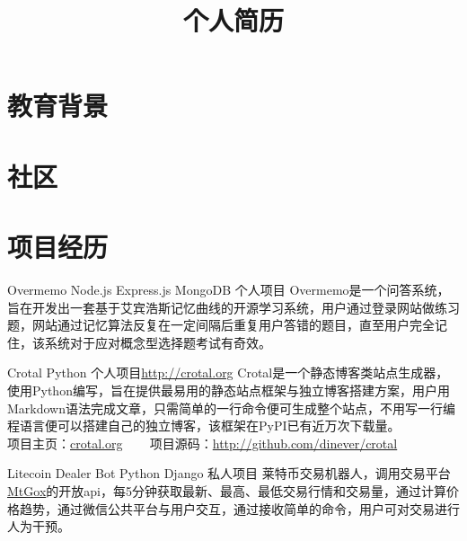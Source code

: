 \documentclass[11pt,a4paper]{moderncv}
\title{个人简历}                      %
\begin{document}
\maketitle

\section{教育背景}


\section{社区}

\section{项目经历}
\renewcommand{\baselinestretch}{1.2}

{Overmemo}
{Node.js Express.js MongoDB}
{个人项目}{}
{Overmemo是一个问答系统，旨在开发出一套基于艾宾浩斯记忆曲线的开源学习系统，用户通过登录网站做练习题，网站通过记忆算法反复在一定间隔后重复用户答错的题目，直至用户完全记住，该系统对于应对概念型选择题考试有奇效。}

{Crotal}
{Python}
{个人项目}{\url{http://crotal.org}}
{Crotal是一个静态博客类站点生成器，使用Python编写，旨在提供最易用的静态站点框架与独立博客搭建方案，用户用Markdown语法完成文章，只需简单的一行命令便可生成整个站点，不用写一行编程语言便可以搭建自己的独立博客，该框架在PyPI已有近万次下载量。\\
项目主页：\href{http://crotal.org}{crotal.org} ~~~ 项目源码：\url{http://github.com/dinever/crotal}}

{Litecoin Dealer Bot}
{Python Django}
{私人项目}{}
{莱特币交易机器人，调用交易平台\href{http://MtGox.com}{MtGox}的开放api，每5分钟获取最新、最高、最低交易行情和交易量，通过计算价格趋势，通过微信公共平台与用户交互，通过接收简单的命令，用户可对交易进行人为干预。}
\end{document}
